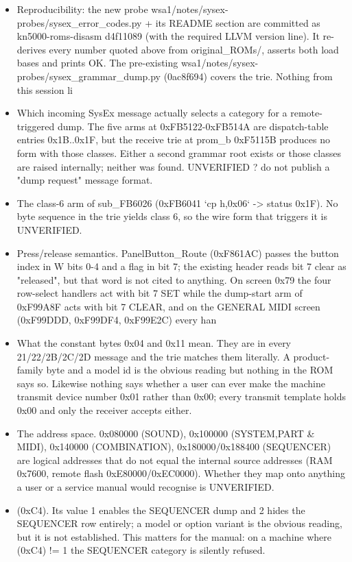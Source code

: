 \begin{itemize}
\item Reproducibility: the new probe wsa1/notes/sysex-probes/sysex\_error\_codes.py + its README section are committed as kn5000-roms-disasm d4f11089 (with the required LLVM version line). It re-derives every number quoted above from original\_ROMs/, asserts both load bases and prints OK. The pre-existing wsa1/notes/sysex-probes/sysex\_grammar\_dump.py (0ac8f694) covers the trie. Nothing from this session li
\item Which incoming SysEx message actually selects a category for a remote-triggered dump. The five arms at 0xFB5122-0xFB514A are dispatch-table entries 0x1B..0x1F, but the receive trie at prom\_b 0xF5115B produces no form with those classes. Either a second grammar root exists or those classes are raised internally; neither was found. UNVERIFIED ? do not publish a "dump request" message format.
\item The class-6 arm of sub\_FB6026 (0xFB6041 `cp h,0x06` -> status 0x1F). No byte sequence in the trie yields class 6, so the wire form that triggers it is UNVERIFIED.
\item Press/release semantics. PanelButton\_Route (0xF861AC) passes the button index in W bits 0-4 and a flag in bit 7; the existing header reads bit 7 clear as "released", but that word is not cited to anything. On screen 0x79 the four row-select handlers act with bit 7 SET while the dump-start arm of 0xF99A8F acts with bit 7 CLEAR, and on the GENERAL MIDI screen (0xF99DDD, 0xF99DF4, 0xF99E2C) every han
\item What the constant bytes 0x04 and 0x11 mean. They are in every 21/22/2B/2C/2D message and the trie matches them literally. A product-family byte and a model id is the obvious reading but nothing in the ROM says so. Likewise nothing says whether a user can ever make the machine transmit device number 0x01 rather than 0x00; every transmit template holds 0x00 and only the receiver accepts either.
\item The address space. 0x080000 (SOUND), 0x100000 (SYSTEM,PART \& MIDI), 0x140000 (COMBINATION), 0x180000/0x188400 (SEQUENCER) are logical addresses that do not equal the internal source addresses (RAM 0x7600, remote flash 0xE80000/0xEC0000). Whether they map onto anything a user or a service manual would recognise is UNVERIFIED.
\item (0xC4). Its value 1 enables the SEQUENCER dump and 2 hides the SEQUENCER row entirely; a model or option variant is the obvious reading, but it is not established. This matters for the manual: on a machine where (0xC4) != 1 the SEQUENCER category is silently refused.

\end{itemize}
